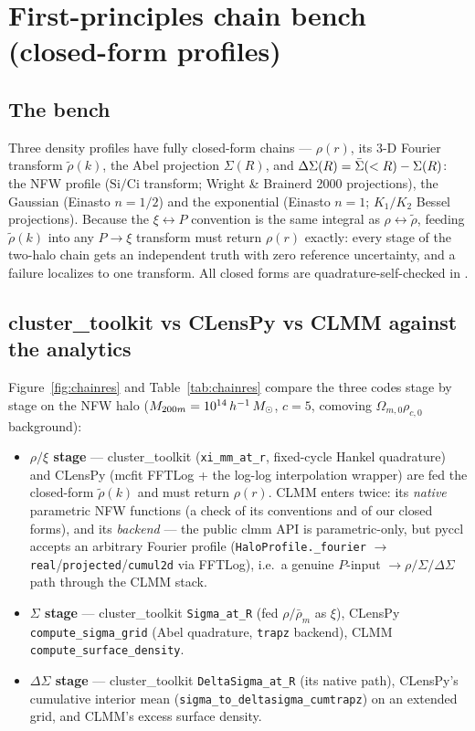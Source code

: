 \section{First-principles chain bench (closed-form profiles)}
\label{sec:chain}

\subsection{The bench}

Three density profiles have fully closed-form chains --- $\rho(r)$, its
3-D Fourier transform $\tilde\rho(k)$, the Abel projection $\Sigma(R)$,
and $\Delta\Sigma(R) = \bar\Sigma(<R) - \Sigma(R)$: the NFW profile
($\mathrm{Si}/\mathrm{Ci}$ transform; Wright \& Brainerd 2000
projections), the Gaussian (Einasto $n{=}1/2$) and the exponential
(Einasto $n{=}1$; $K_1/K_2$ Bessel projections). Because the
$\xi \leftrightarrow P$ convention is the same integral as
$\rho \leftrightarrow \tilde\rho$, feeding $\tilde\rho(k)$ into any
$P\!\to\!\xi$ transform must return $\rho(r)$ exactly: every stage of
the two-halo chain gets an independent truth with zero reference
uncertainty, and a failure localizes to one transform. All closed
forms are quadrature-self-checked in
.

\subsection{cluster\_toolkit vs CLensPy vs CLMM against the analytics}
\label{sec:chain-codes}

Figure~\ref{fig:chainres} and Table~\ref{tab:chainres} compare the
three codes stage by stage on the NFW halo
($M_{200m} = 10^{14}\,h^{-1}\,M_{\odot}$, $c = 5$, comoving
$\Omega_{m,0}\rho_{c,0}$ background):

\begin{itemize}
\item \textbf{$\rho/\xi$ stage} --- cluster\_toolkit
  (\texttt{xi\_mm\_at\_r}, fixed-cycle Hankel quadrature) and CLensPy
  (mcfit FFTLog + the log-log interpolation wrapper) are fed the
  closed-form $\tilde\rho(k)$ and must return $\rho(r)$. CLMM enters
  twice: its \emph{native} parametric NFW functions (a check of its
  conventions and of our closed forms), and its \emph{backend} --- the
  public clmm API is parametric-only, but pyccl accepts an arbitrary
  Fourier profile (\texttt{HaloProfile.\_fourier} $\to$
  \texttt{real}/\texttt{projected}/\texttt{cumul2d} via FFTLog), i.e.\
  a genuine $P$-input $\to \rho/\Sigma/\Delta\Sigma$ path through the
  CLMM stack.
\item \textbf{$\Sigma$ stage} --- cluster\_toolkit
  \texttt{Sigma\_at\_R} (fed $\rho/\bar\rho_m$ as $\xi$), CLensPy
  \texttt{compute\_sigma\_grid} (Abel quadrature, \texttt{trapz}
  backend), CLMM \texttt{compute\_surface\_density}.
\item \textbf{$\Delta\Sigma$ stage} --- cluster\_toolkit
  \texttt{DeltaSigma\_at\_R} (its native path), CLensPy's cumulative
  interior mean (\texttt{sigma\_to\_delta\-sigma\_cumtrapz}) on an
  extended grid, and CLMM's excess surface density.
\end{itemize}

